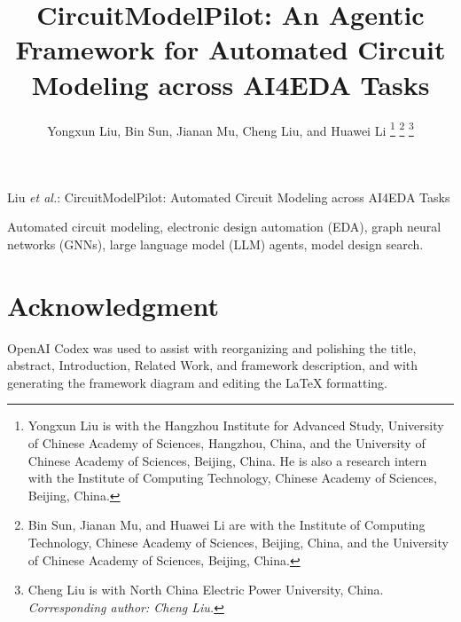 \documentclass[10pt,journal,letterpaper]{IEEEtran}
\begin{document}
\title{CircuitModelPilot: An Agentic Framework for Automated Circuit Modeling across AI4EDA Tasks}

\author{Yongxun Liu, Bin Sun, Jianan Mu, Cheng Liu, and Huawei Li%
\thanks{Yongxun Liu is with the Hangzhou Institute for Advanced Study, University of Chinese Academy of Sciences, Hangzhou, China, and the University of Chinese Academy of Sciences, Beijing, China. He is also a research intern with the Institute of Computing Technology, Chinese Academy of Sciences, Beijing, China.}%
\thanks{Bin Sun, Jianan Mu, and Huawei Li are with the Institute of Computing Technology, Chinese Academy of Sciences, Beijing, China, and the University of Chinese Academy of Sciences, Beijing, China.}%
\thanks{Cheng Liu is with North China Electric Power University, China. \textit{Corresponding author: Cheng Liu.}}}



%
{Liu \MakeLowercase{\textit{et al.}}: CircuitModelPilot: Automated Circuit Modeling across AI4EDA Tasks}


\maketitle







\begin{IEEEkeywords}
Automated circuit modeling, electronic design automation (EDA), graph neural networks (GNNs), large language model (LLM) agents, model design search.
\end{IEEEkeywords}









\section*{Acknowledgment}
OpenAI Codex was used to assist with reorganizing and polishing the title, abstract, Introduction, Related Work, and framework description, and with generating the framework diagram and editing the \LaTeX{} formatting.



\end{document}
